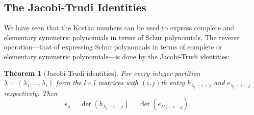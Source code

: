 \documentclass[11pt]{amsproc}
\newtheorem{theorem}{Theorem}[subsection]
\theoremstyle{definition}
\theoremstyle{example}
\begin{document}
\subsection{The Jacobi-Trudi Identities}
\label{sec:jacobi-trudi-ident}
We have seen that the Kostka numbers can be used to express complete and elementary symmetric polynomials in terms of Schur polynomials.
The reverse operation---that of expressing Schur polynomials in terms of complete or elementary symmetric polynomials---is done by the Jacobi-Trudi identities:
\begin{theorem}
  [Jacobi-Trudi identities]
  For every integer partition $\lambda=(\lambda_1,\dotsc,\lambda_l)$ form the $l\times l$ matrices with $(i,j)$th entry $h_{\lambda_i-i+j}$ and $e_{\lambda_i-i+j}$ respectively.
  Then
  \begin{displaymath}
    s_\lambda = \det(h_{\lambda_i-i+j})= \det(e_{\lambda'_j+i-j}).
  \end{displaymath}
\end{theorem}
\end{document}
